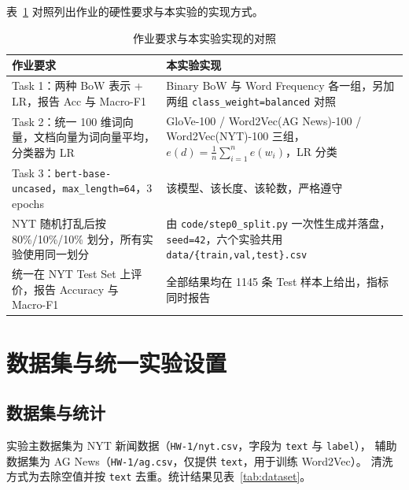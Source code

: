 \documentclass[12pt,a4paper]{ctexart}
\newcommand{\fpath}[1]{\texttt{#1}}
\begin{document}
表~\ref{tab:compliance} 对照列出作业的硬性要求与本实验的实现方式。

\begin{table}[htbp]
\centering
\small
\caption{作业要求与本实验实现的对照}
\label{tab:compliance}
\begin{tabular}{p{5.6cm}p{9.4cm}}
\toprule
作业要求 & 本实验实现 \\
\midrule
Task 1：两种 BoW 表示 + LR，报告 Acc 与 Macro-F1
  & Binary BoW 与 Word Frequency 各一组，另加两组 \fpath{class\_weight=balanced} 对照 \\
Task 2：统一 100 维词向量，文档向量为词向量平均，分类器为 LR
  & GloVe-100 / Word2Vec(AG News)-100 / Word2Vec(NYT)-100 三组，
    $e(d)=\frac{1}{n}\sum_{i=1}^{n}e(w_i)$，LR 分类 \\
Task 3：\fpath{bert-base-uncased}，\fpath{max\_length=64}，3 epochs
  & 该模型、该长度、该轮数，严格遵守 \\
NYT 随机打乱后按 80\%/10\%/10\% 划分，所有实验使用同一划分
  & 由 \fpath{code/step0\_split.py} 一次性生成并落盘，
    \fpath{seed=42}，六个实验共用 \fpath{data/\{train,val,test\}.csv} \\
统一在 NYT Test Set 上评价，报告 Accuracy 与 Macro-F1
  & 全部结果均在 1145 条 Test 样本上给出，指标同时报告 \\
\bottomrule
\end{tabular}
\end{table}

\section{数据集与统一实验设置}

\subsection{数据集与统计}

实验主数据集为 NYT 新闻数据（\fpath{HW-1/nyt.csv}，字段为 \fpath{text} 与 \fpath{label}），
辅助数据集为 AG News（\fpath{HW-1/ag.csv}，仅提供 \fpath{text}，用于训练 Word2Vec）。
清洗方式为去除空值并按 \fpath{text} 去重。统计结果见表~\ref{tab:dataset}。
\end{document}
